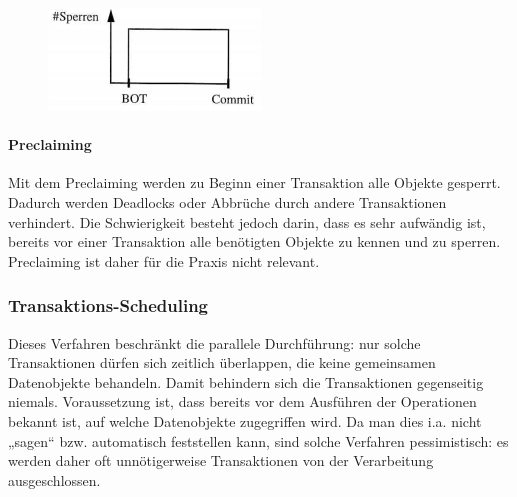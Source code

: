 \begin{minipage}{0.4\textwidth}
\begin{figure}[H]
\includegraphics{Content/images/gleichzeitigkeit/preclaiming.png}
\end{figure}
\end{minipage} \hfill
\begin{minipage}{0.55\textwidth}
\paragraph{Preclaiming}
Mit dem Preclaiming werden zu Beginn einer Transaktion alle Objekte gesperrt. Dadurch werden Deadlocks oder Abbrüche durch andere Transaktionen verhindert. Die Schwierigkeit besteht jedoch darin, dass es sehr aufwändig ist, bereits vor einer Transaktion alle benötigten Objekte zu kennen und zu sperren. Preclaiming ist daher für die Praxis nicht relevant.
\end{minipage}

\subsubsection{Transaktions-Scheduling}
Dieses Verfahren beschränkt die parallele Durchführung: nur solche Transaktionen dürfen sich zeitlich überlappen, die keine gemeinsamen Datenobjekte behandeln. Damit behindern sich die Transaktionen gegenseitig niemals.
\newline
Voraussetzung ist, dass bereits vor dem Ausführen der Operationen bekannt ist, auf welche Datenobjekte zugegriffen wird. Da man dies i.a. nicht „sagen“ bzw. automatisch feststellen kann, sind solche Verfahren pessimistisch: es werden daher oft unnötigerweise Transaktionen von der Verarbeitung ausgeschlossen.

